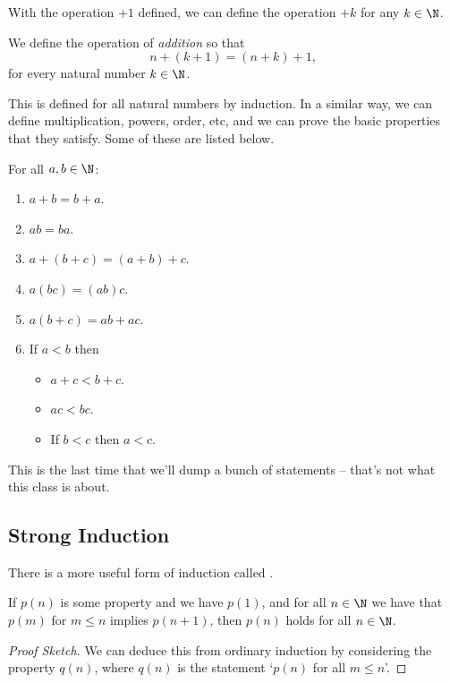 \documentclass[a4]{scrartcl}
\begin{document}
With the operation $+1$ defined, we can define the operation $+k$ for any $k \in \N$.

\begin{definition}[Addition]
	We define the operation of \emph{addition} so that
	$$
	n + (k + 1) = (n + k) + 1,
	$$
	for every natural number $k \in \N$.
\end{definition}

This is defined for all natural numbers by induction.
In a similar way, we can define multiplication, powers, order, etc, and we can prove the basic properties that they satisfy. Some of these are listed below.

\begin{proposition}
	For all $a, b \in \N$:
	\begin{enumerate}[label=(\roman*)]
		\item $a + b = b + a$.
		\item $ab = ba$.
		\item $a + (b + c) = (a + b) + c$.
		\item $a(bc) = (ab)c$.
		\item $a(b + c) = ab + ac$.
		\item If $a < b$ then
		\begin{itemize}
			\item $a + c < b + c$.
			\item $ac < bc$.
			\item If $b < c$ then $a < c$.
		\end{itemize}
	\end{enumerate}
\end{proposition}

\begin{remark}
	This is the last time that we'll dump a bunch of statements -- that's not what this class is about.
\end{remark}

\subsection{Strong Induction}

There is a more useful form of induction called .

\begin{proposition}
	If $p(n)$ is some property and we have $p(1)$, and for all $n \in \N$ we have that $p(m)$ for $m \leq n$ implies $p(n+1)$, then $p(n)$ holds for all $n \in \N$.
\end{proposition}
\begin{proof}[Proof Sketch]
	We can deduce this from ordinary induction by considering the property $q(n)$, where $q(n)$ is the statement `$p(n)$ for all $m \leq n$'.
\end{proof}
\end{document}
